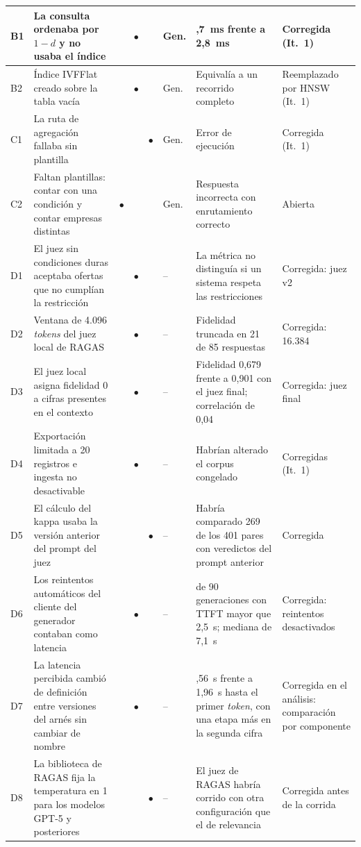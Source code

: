{\begin{longtable}{|p{0.5cm}|>{\raggedright\arraybackslash}p{4.0cm}|c|c|c|p{0.75cm}|>{\raggedright\arraybackslash}p{3.4cm}|>{\raggedright\arraybackslash}p{2.5cm}|}
    \hline
    B1 & La consulta ordenaba por $1-d$ y no usaba el índice &  & $\bullet$ &  & Gen. & 25,7~ms frente a 2,8~ms & Corregida (It.~1) \\
    \hline
    B2 & Índice IVFFlat creado sobre la tabla vacía &  & $\bullet$ &  & Gen. & Equivalía a un recorrido completo & Reemplazado por HNSW (It.~1) \\
    \hline
    C1 & La ruta de agregación fallaba sin plantilla &  &  & $\bullet$ & Gen. & Error de ejecución & Corregida (It.~1) \\
    \hline
    C2 & Faltan plantillas: contar con una condición y contar empresas distintas & $\bullet$ &  &  & Gen. & Respuesta incorrecta con enrutamiento correcto & Abierta \\
    \hline
    D1 & El juez sin condiciones duras aceptaba ofertas que no cumplían la restricción &  & $\bullet$ &  & -- & La métrica no distinguía si un sistema respeta las restricciones & Corregida: juez v2 \\
    \hline
    D2 & Ventana de 4.096 \textit{tokens} del juez local de RAGAS &  & $\bullet$ &  & -- & Fidelidad truncada en 21 de 85 respuestas & Corregida: 16.384 \\
    \hline
    D3 & El juez local asigna fidelidad 0 a cifras presentes en el contexto &  & $\bullet$ &  & -- & Fidelidad 0,679 frente a 0,901 con el juez final; correlación de 0,04 & Corregida: juez final \\
    \hline
    D4 & Exportación limitada a 20 registros e ingesta no desactivable &  & $\bullet$ &  & -- & Habrían alterado el corpus congelado & Corregidas (It.~1) \\
    \hline
    D5 & El cálculo del kappa usaba la versión anterior del prompt del juez &  &  & $\bullet$ & -- & Habría comparado 269 de los 401 pares con veredictos del prompt anterior & Corregida \\
    \hline
    D6 & Los reintentos automáticos del cliente del generador contaban como latencia &  & $\bullet$ &  & -- & 59 de 90 generaciones con TTFT mayor que 2,5~s; mediana de 7,1~s & Corregida: reintentos desactivados \\
    \hline
    D7 & La latencia percibida cambió de definición entre versiones del arnés sin cambiar de nombre &  & $\bullet$ &  & -- & 0,56~s frente a 1,96~s hasta el primer \textit{token}, con una etapa más en la segunda cifra & Corregida en el análisis: comparación por componente \\
    \hline
    D8 & La biblioteca de RAGAS fija la temperatura en 1 para los modelos GPT-5 y posteriores &  &  & $\bullet$ & -- & El juez de RAGAS habría corrido con otra configuración que el de relevancia & Corregida antes de la corrida \\

\end{longtable}}
